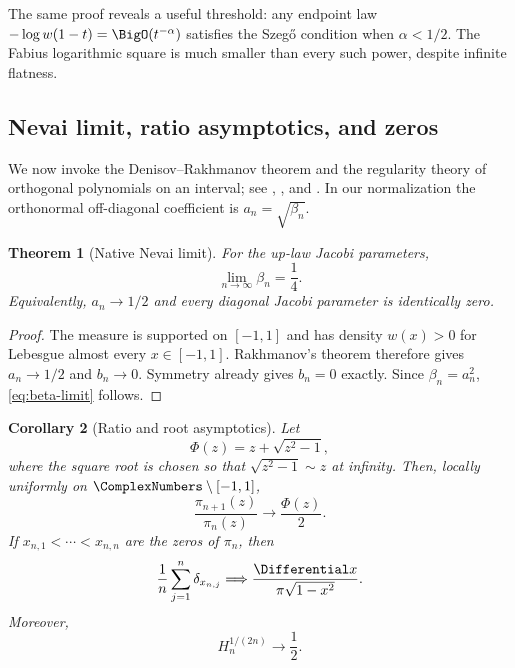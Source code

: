 \documentclass[11pt,oneside]{article}
\newtheorem{theorem}{Theorem}[section]
\newtheorem{corollary}[theorem]{Corollary}
\theoremstyle{definition}
\theoremstyle{remark}
\numberwithin{equation}{section}
\begin{document}
The same proof reveals a useful threshold: any endpoint law
$-\log w(1-t)=\BigO(t^{-\alpha})$ satisfies the Szeg\H{o} condition when
$\alpha<1/2$.  The Fabius logarithmic square is much smaller than every such
power, despite infinite flatness.

\subsection{Nevai limit, ratio asymptotics, and zeros}
We now invoke the Denisov--Rakhmanov theorem and the regularity theory of
orthogonal polynomials on an interval; see
\cite[Chs.~1 and 12]{SimonOPRL}, \cite[Chs.~1--3]{StahlTotik}, and
\cite[Ch.~12]{Szego}.  In our normalization the orthonormal off-diagonal
coefficient is $a_n=\sqrt{\beta_n}$.

\begin{theorem}[Native Nevai limit]
\label{thm:nevai-limit}
For the up-law Jacobi parameters,
\begin{equation}
 \boxed{\lim_{n\to\infty}\beta_n=\frac14.}
 \label{eq:beta-limit}
\end{equation}
Equivalently, $a_n\to1/2$ and every diagonal Jacobi parameter is identically
zero.
\end{theorem}

\begin{proof}
The measure is supported on $[-1,1]$ and has density $w(x)>0$ for Lebesgue
almost every $x\in[-1,1]$.  Rakhmanov's theorem therefore gives
$a_n\to1/2$ and $b_n\to0$.  Symmetry already gives $b_n=0$ exactly.
Since $\beta_n=a_n^2$, \cref{eq:beta-limit} follows.
\end{proof}

\begin{corollary}[Ratio and root asymptotics]
\label{cor:ratio-root-asymptotics}
Let
\begin{equation}
 \Phi(z)=z+\sqrt{z^2-1},
 \label{eq:joukowski}
\end{equation}
where the square root is chosen so that $\sqrt{z^2-1}\sim z$ at infinity.
Then, locally uniformly on $\ComplexNumbers\setminus[-1,1]$,
\begin{equation}
 \frac{\pi_{n+1}(z)}{\pi_n(z)}\longrightarrow\frac{\Phi(z)}2.
 \label{eq:ratio-asymptotic}
\end{equation}
If $x_{n,1}<\cdots<x_{n,n}$ are the zeros of $\pi_n$, then
\begin{equation}
 \frac1n\sum_{j=1}^{n}\delta_{x_{n,j}}
 \Longrightarrow
 \frac{\Differential x}{\pi\sqrt{1-x^2}}.
 \label{eq:arcsine-zero-limit}
\end{equation}
Moreover,
\begin{equation}
 H_n^{1/(2n)}\longrightarrow\frac12.
 \label{eq:norm-capacity-limit}
\end{equation}
\end{corollary}
\end{document}
